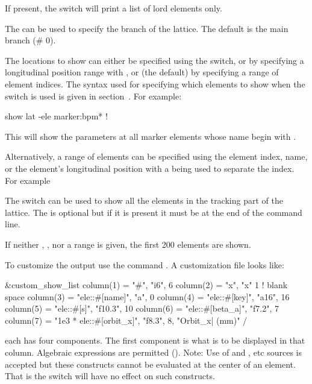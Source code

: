 {{{\begin{description}
If present, the  switch will print a list of lord elements only.

The  can be used to specify the branch of the lattice.
The default is the main branch (\# 0).

The locations to show can either be specified using the 
switch, or by specifying a longitudinal position range with ,
or (the default) by specifying a range of element indices.  The syntax
used for specifying which elements to show when the 
 switch is used is given in section~. 
For example:
\begin{example}
  show lat -ele marker:bpm*   !
\end{example}
This will show the parameters at all marker elements whose name begin
with . 

Alternatively, a range of elements can be specified using the element
index, name, or the element's longitudinal position with a  being
used to separate the index. For example
The  switch can be used to show all the elements
in the tracking part of the lattice. The
 is optional but if it is present it must be at the
end of the command line.

If neither , , nor a range is given,
the first 200 elements are shown.

To customize the output use the command . A customization file looks like:
\begin{example}
  &custom_show_list
    column(1) = "#",                     "i6",     6 
    column(2) = "x",                     "x"       1       ! blank space
    column(3) = "ele::#[name]",          "a",      0
    column(4) = "ele::#[key]",           "a16",   16
    column(5) = "ele::#[s]",             "f10.3", 10
    column(6) = "ele::#[beta_a]",        "f7.2",   7
    column(7) = "1e3 * ele::#[orbit_x]", "f8.3",   8, "Orbit_x| (mm)" 
  /
\end{example}
each  has four components. The first component is what
is to be displayed in that column. Algebraic expressions are permitted
(). Note: Use of  and , etc
sources is accepted but these constructs cannot be evaluated at the
center of an element. That is the  switch will have no
effect on such constructs.


\end{description}}}}
